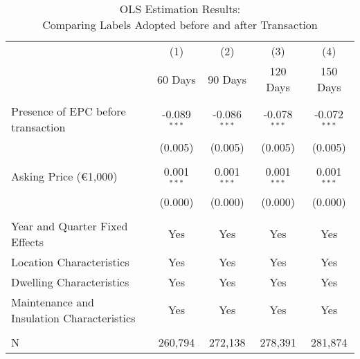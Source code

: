 \documentclass[12pt]{article}
\begin{document}
\clearpage
\newpage
\begin{table}[H]
\footnotesize
  \centering
  \caption{OLS Estimation Results: \\Comparing Labels Adopted before and after Transaction}
      \begin{tabular}{lcccc}
\hline
                &\multicolumn{1}{c}{(1)}&\multicolumn{1}{c}{(2)}&\multicolumn{1}{c}{(3)}&\multicolumn{1}{c}{(4)}\\
&	60 Days & 90 Days & 120 Days & 150 Days \\
\hline
&&&&\\
Presence of EPC before transaction	& -0.089$^{***}$ & -0.086$^{***}$ & -0.078$^{***}$ & 	-0.072$^{***}$ \\
& (0.005) & (0.005) & (0.005) & (0.005) \\
&&&&\\
Asking Price (\euro 1,000)	& 0.001$^{***}$ & 0.001$^{***}$ & 0.001$^{***}$ & 0.001$^{***}$ \\
& (0.000) & (0.000) & (0.000) & (0.000) \\
&&&&\\
Year and Quarter Fixed Effects	& Yes &	Yes & Yes & Yes \\
Location Characteristics	& Yes &	Yes & Yes & Yes \\
Dwelling Characteristics	& Yes &	Yes & Yes & Yes \\
Maintenance and Insulation Characteristics	& Yes &	Yes & Yes & Yes \\
&&&&\\
N 	& 260,794 & 272,138 & 278,391 & 281,874 \\
\hline


\end{tabular}
\end{table}
\end{document}

